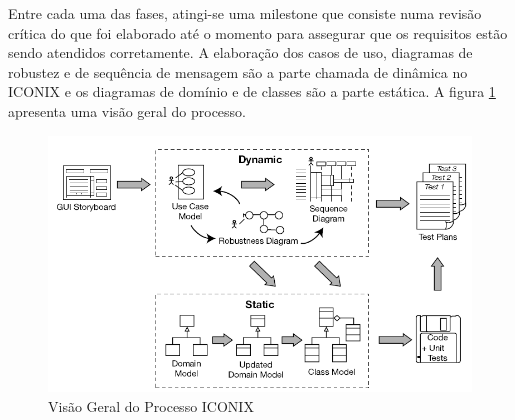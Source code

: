 \documentclass[
	12pt,				%
	openright,			%
	oneside,			%
	a4paper,			%
	english,			%
	spanish,			%
	brazil				%
	]{abntex2}
\begin{document}
	Entre cada uma das fases, atingi-se uma milestone que consiste numa revisão crítica do que foi elaborado até o momento para assegurar que os requisitos estão sendo atendidos corretamente. A elaboração dos casos de uso, diagramas de robustez e de sequência de mensagem são a parte chamada de dinâmica no ICONIX e os diagramas de domínio e de classes são a parte estática. A figura \ref{iconix_diagram} apresenta uma visão geral do processo.
	
\begin{figure}[!htb]
\centering
\includegraphics[scale=0.5]{iconix}
\caption{Visão Geral do Processo ICONIX \cite{iconix}}
\label{iconix_diagram}
\end{figure}

	 
	

\postextual



	
\end{document}

